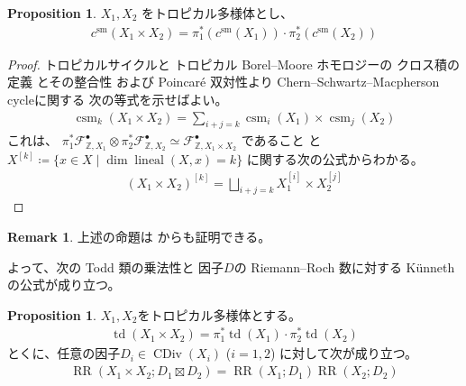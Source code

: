 \documentclass[a4paper,dvipdfmx,reqno,12pt]{amsart}
\theoremstyle{definition}
\newtheorem{proposition}[theorem]{Proposition}
\newtheorem{remark}[theorem]{Remark}
\newcommand{\deq}{\coloneqq}
\newcommand{\opn}[1]{\operatorname{#1}}
\numberwithin{equation}{section}
\begin{document}
\begin{proposition}
$X_1,X_2$ をトロピカル多様体とし、
\begin{align}
c^{\mathrm{sm}}(X_1\times X_2)=
\pi^{*}_1(c^{\mathrm{sm}}(X_1))\cdot 
\pi^{*}_2(c^{\mathrm{sm}}(X_2))
\end{align}

\end{proposition}

\begin{proof}
トロピカルサイクルと
トロピカル
Borel--Moore ホモロジーの
クロス積の定義
\cite[Definition 3.7, 
Definition 4.15]{gross2019sheaftheoretic}
とその整合性
\cite[Proposition 5.9]{gross2019sheaftheoretic}
および Poincar\'e 双対性より
Chern--Schwartz--Macpherson cycleに関する
次の等式を示せばよい。
\begin{align}
\opn{csm}_k(X_1\times X_2)=\sum_{i+j=k}
\opn{csm}_{i}(X_1)\times \opn{csm}_{j}(X_2)
\end{align}
これは、
$\pi_1^{*}\mathcal{F}^{\bullet}_{\mathbb{Z},X_1}\otimes
\pi_2^{*}\mathcal{F}^{\bullet}_{\mathbb{Z},X_2}
\simeq \mathcal{F}^{\bullet}_{\mathbb{Z},X_1\times X_2}$
であること\cite[Lemma 4.14]{gross2019sheaftheoretic}
と
$X^{[k]}\deq \{x\in X\mid \dim \opn{lineal}(X,x)=k\}$
に関する次の公式からわかる。
\begin{align}
(X_1\times X_2)^{[k]}=\bigsqcup_{i+j=k}
X_1^{[i]}\times X_2^{[j]}
\end{align}

\end{proof}

\begin{remark}上述の命題は
\cite[Proposition 5.1]{demedrano2023chern}
からも証明できる。
\end{remark}

よって、次の Todd 類の乗法性と
因子$D$の Riemann--Roch 数に対する
 K\"unneth の公式が成り立つ。

\begin{proposition}
$X_1,X_2$をトロピカル多様体とする。
\begin{align}
\opn{td}(X_1\times X_2)=\pi_{1}^{*}\opn{td}(X_1)\cdot 
\pi_{2}^{*}\opn{td}(X_2)
\end{align}
とくに、任意の因子$D_i\in \opn{CDiv}(X_i)$ ($i=1,2$)
に対して次が成り立つ。
\begin{align}
\opn{RR}(X_1\times X_2;D_1\boxtimes D_2)
=\opn{RR}(X_1;D_1)\opn{RR}(X_2;D_2)
\end{align}

\end{proposition}
\end{document}
